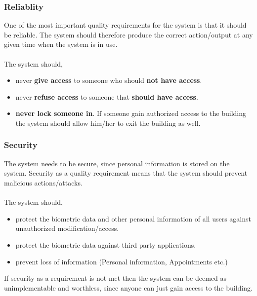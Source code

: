 \subsubsection{Reliablity}
One of the most important quality requirements for the system is that it should be reliable.
The system should therefore produce the correct action/output at any given time when the system is in use.\\
\\The system should,
\begin{itemize}
	\item  never \textbf{give access} to someone who should \textbf{not have access}.
	\item  never \textbf{refuse access} to someone that\textbf{ should have access}. 
	\item  \textbf{never lock someone in}. If someone gain authorized access to the building the system should allow him/her to exit the building as well.

\end{itemize}

\subsubsection{Security}
The system needs to be secure, since personal information is stored on the system. Security as a quality requirement means that the system should prevent malicious actions/attacks.\\
\\The system should,
\begin{itemize}
	\item  protect the biometric data and other personal information of all users against unauthorized modification/access.
	\item  protect the biometric data against third party applications.
	\item  prevent loss of information (Personal information, Appointments etc.)
\end{itemize}

If security as a requirement is not met then the system can be deemed as unimplementable and worthless, since anyone can just gain access to the building.

